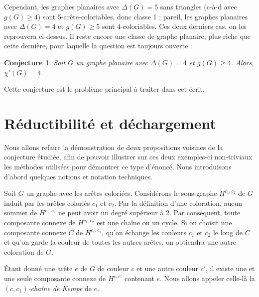 \documentclass[10pt,a4paper]{article}
\newtheorem{conjecture}{Conjecture}
\begin{document}
Cependant, les graphes planaires avec $\Delta(G)=5$ sans triangles (c-à-d avec $g(G)\ge 4$) sont 5-arête-coloriables, donc classe 1 ; pareil, les graphes planaires avec $\Delta(G) = 4$ et $g(G)\ge 5$ sont $4$-coloriables. Ces deux derniers cas, on les reprouvera ci-dessus. Il reste encore une classe de graphe planaire, plus riche que cette dernière, pour laquelle la question est toujours ouverte :

\begin{conjecture}
Soit $G$ un graphe planaire avec $\Delta(G) = 4$ et $g(G) \geq 4$. Alors, $\chi'(G) = 4$. 
\end{conjecture} 

Cette conjecture est le problème principal à traiter dans cet écrit. 

\section{Réductibilité et déchargement}
\label{chap:easy}

Nous allons refaire la démonstration de deux propositions voisines de la conjecture étudiée, afin de pouvoir illustrer sur ces deux exemples-ci non-triviaux les méthodes utilisées pour démontrer ce type d'énoncé. Nous introduisons d'abord quelques notions et notation techniques.

Soit $G$ un graphe avec les arêtes coloriées. 
Considérons le sous-graphe $H^{c_1,c_2}$ de $G$ induit par les arêtes coloriés $c_1$ et $c_2$. Par la définition d'une coloration, aucun sommet de $H^{c_1,c_2}$ ne peut avoir un degré supérieur à 2. Par conséquent, toute composante connexe de $H^{c_1,c_2}$ est une chaîne ou un cycle. Si on choisit une composante connexe $C$ de $H^{c_1,c_2}$, qu'on échange les couleurs $c_1$ et $c_2$ le long de $C$ et qu'on garde la couleur de toutes les autres arêtes, on obtiendra une autre coloration de $G$.

Étant donné une arête $e$ de $G$ de couleur $c$ et une autre couleur $c'$, il existe une et une seule composante connexe de $H^{c,c'}$ contenant $e$.
Nous allons appeler celle-là la \emph{$(c,c_1)$-chaîne de Kempe} de $e$. 



\end{document}

